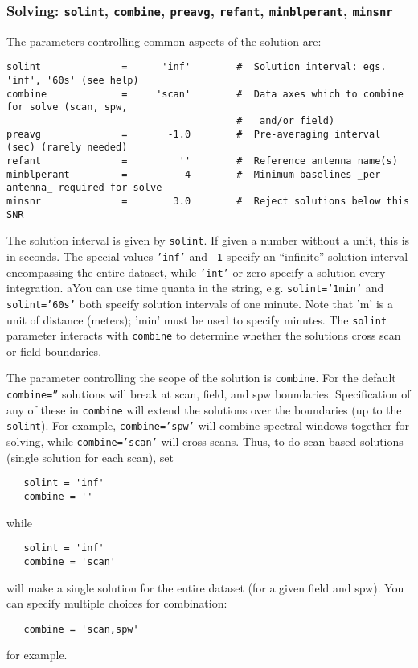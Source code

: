 \subsubsection{Solving: {\tt solint}, {\tt combine},
{\tt preavg}, {\tt refant}, {\tt minblperant}, {\tt minsnr} }
\label{section:cal.solve.pars.solving}

The parameters controlling common aspects of the solution are:
\small
\begin{verbatim}
solint              =      'inf'        #  Solution interval: egs. 'inf', '60s' (see help)
combine             =     'scan'        #  Data axes which to combine for solve (scan, spw,
                                        #   and/or field)
preavg              =       -1.0        #  Pre-averaging interval (sec) (rarely needed)
refant              =         ''        #  Reference antenna name(s)
minblperant         =          4        #  Minimum baselines _per antenna_ required for solve
minsnr              =        3.0        #  Reject solutions below this SNR
\end{verbatim} 
\normalsize

The solution interval is given by {\tt solint}.  If given a number
without a unit, this is in seconds.  
The special values {\tt 'inf'} and {\tt -1} specify an ``infinite''
solution interval encompassing the entire dataset,
while {\tt 'int'} or zero specify a solution every integration.
aYou can use time quanta in the string,
e.g. {\tt solint='1min'} and {\tt solint='60s'} both specify solution
intervals of one minute.  Note that 'm' is a unit of distance
(meters); 'min' must be used to specify minutes.
The {\tt solint} parameter interacts with 
{\tt combine} to determine whether the solutions cross scan or field
boundaries.

The parameter controlling the scope of the solution is {\tt combine}.
For the default {\tt combine=''} solutions will break at scan, field, and spw
boundaries.  Specification of any of these in {\tt combine} will
extend the solutions over the boundaries (up to the {\tt solint}). 
For example, {\tt combine='spw'} will combine spectral windows
together for solving, while {\tt combine='scan'} will cross scans.  
Thus, to do scan-based solutions (single solution for each scan), set
\small
\begin{verbatim}
   solint = 'inf'
   combine = ''
\end{verbatim} 
\normalsize
while
\small
\begin{verbatim}
   solint = 'inf'
   combine = 'scan'
\end{verbatim} 
\normalsize
will make a single solution for the entire dataset (for a given field
and spw).  You can specify multiple choices for combination:
\small
\begin{verbatim}
   combine = 'scan,spw'
\end{verbatim} 
\normalsize
for example.

